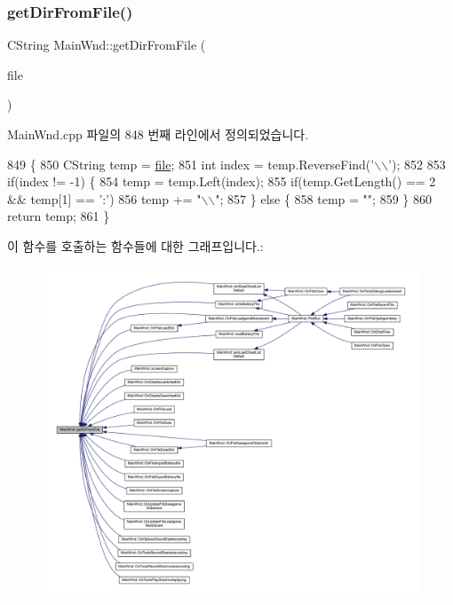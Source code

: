 \mbox{\label{class_main_wnd_a55c4858ec2c3f621790c9c7aec67011e}} 
\subsubsection{\texorpdfstring{get\+Dir\+From\+File()}{getDirFromFile()}}
{\footnotesize\ttfamily C\+String Main\+Wnd\+::get\+Dir\+From\+File (\begin{DoxyParamCaption}\item[{C\+String \&}]{file }\end{DoxyParamCaption})}



Main\+Wnd.\+cpp 파일의 848 번째 라인에서 정의되었습니다.


\begin{DoxyCode}
849 \{
850   CString temp = \mbox{\hyperlink{expr-lex_8cpp_a702945180aa732857b380a007a7e2a21}{file}};
851   \textcolor{keywordtype}{int} index = temp.ReverseFind(\textcolor{charliteral}{'\(\backslash\)\(\backslash\)'});
852 
853   \textcolor{keywordflow}{if}(index != -1) \{
854     temp = temp.Left(index);
855     \textcolor{keywordflow}{if}(temp.GetLength() == 2 && temp[1] == \textcolor{charliteral}{':'})
856       temp += \textcolor{stringliteral}{"\(\backslash\)\(\backslash\)"};
857   \} \textcolor{keywordflow}{else} \{
858     temp = \textcolor{stringliteral}{""};
859   \}
860   \textcolor{keywordflow}{return} temp;
861 \}
\end{DoxyCode}
이 함수를 호출하는 함수들에 대한 그래프입니다.\+:
\nopagebreak
\begin{figure}[H]
\begin{center}
\leavevmode
\includegraphics[width=350pt]{class_main_wnd_a55c4858ec2c3f621790c9c7aec67011e_icgraph}
\end{center}
\end{figure}
\mbox{\label{class_main_wnd_a3ee1d2026d24932c2ca0985c04fc8dd5}} 
